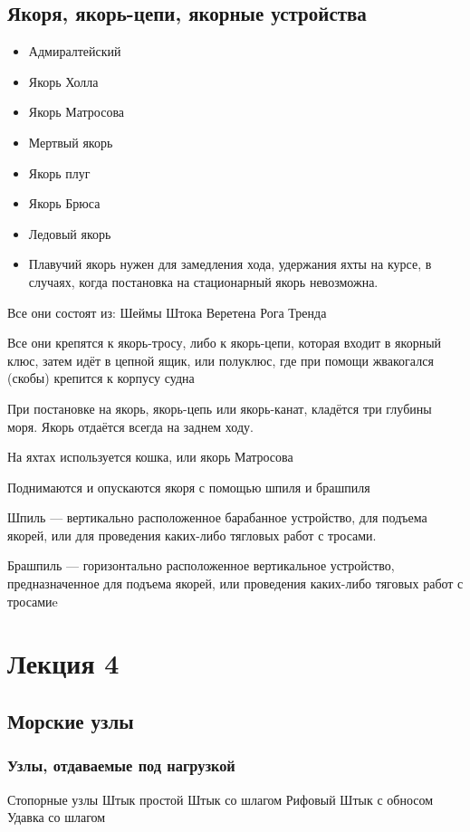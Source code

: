 \documentclass{article}        %
\begin{document}
\subsection{Якоря, якорь-цепи, якорные устройства}
\begin{itemize}
	\item Адмиралтейский
	\item Якорь Холла
	\item Якорь Матросова
	\item Мертвый якорь
	\item Якорь плуг
	\item Якорь Брюса
	\item Ледовый якорь
	\item Плавучий якорь 
		нужен для замедления хода, удержания яхты на курсе, в случаях, когда постановка на стационарный якорь невозможна.
\end{itemize}

Все они состоят из:
	Шеймы
	Штока
	Веретена
	Рога
	Тренда

Все они крепятся к якорь-тросу, либо к якорь-цепи, которая входит в якорный клюс, затем идёт в цепной ящик, или полуклюс, где при помощи жвакогался (скобы) крепится к корпусу судна

При постановке на якорь, якорь-цепь или якорь-канат, кладётся три глубины моря.
Якорь отдаётся всегда на заднем ходу.

На яхтах используется кошка, или якорь Матросова

Поднимаются и опускаются якоря с помощью шпиля и брашпиля

Шпиль --- вертикально расположенное барабанное устройство, для подъема якорей, или для проведения каких-либо тягловых работ с тросами.

Брашпиль --- горизонтально расположенное вертикальное устройство, предназначенное для подъема якорей, или проведения каких-либо тяговых работ с тросамиe


\section{Лекция 4}
\subsection{Морские узлы}
\subsubsection{Узлы, отдаваемые под нагрузкой}
	Стопорные узлы
	Штык простой
	Штык со шлагом
	Рифовый
	Штык с обносом
	Удавка со шлагом
\end{document}
